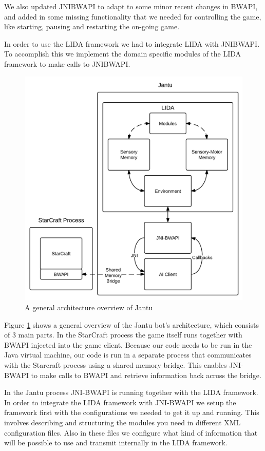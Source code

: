 We also updated JNIBWAPI to adapt to some minor recent changes in BWAPI, and added in some missing functionality that we needed for controlling the game, like starting, pausing and restarting the on-going game.

In order to use the LIDA framework we had to integrate LIDA with JNIBWAPI. To accomplish this we implement the domain specific modules of the LIDA framework to make calls to JNIBWAPI.

\begin{figure}[h!tb]
\centering
\includegraphics[scale=1.0]{graphics/jantu.png}
\caption{A general architecture overview of Jantu}
\label{fig:jantu}
\end{figure}

Figure \ref{fig:jantu} shows a general overview of the Jantu bot's architecture, which consists of 3 main parts. In the StarCraft process the game itself runs together with BWAPI injected into the game client. Because our code needs to be run in the Java virtual machine, our code is run in a separate process that communicates with the Starcraft process using a shared memory bridge. This enables JNI-BWAPI to make calls to BWAPI and retrieve information back across the bridge.

In the Jantu process JNI-BWAPI is running together with the LIDA framework. In order to integrate the LIDA framework with JNI-BWAPI we setup the framework first with the configurations we needed to get it up and running. This involves describing and structuring the modules you need in different XML configuration files. Also in these files we configure what kind of information that will be possible to use and transmit internally in the LIDA framework.

